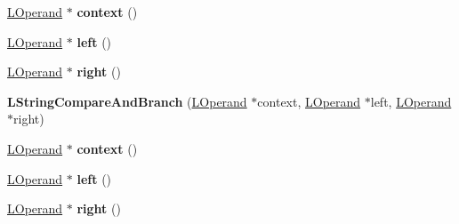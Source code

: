 \begin{DoxyCompactItemize}
\item 
\hyperlink{classv8_1_1internal_1_1_l_operand}{L\+Operand} $\ast$ {\bfseries context} ()\hypertarget{classv8_1_1internal_1_1_l_string_compare_and_branch_a15d4b6ad859b22bf4141edc055fe8050}{}\label{classv8_1_1internal_1_1_l_string_compare_and_branch_a15d4b6ad859b22bf4141edc055fe8050}

\item 
\hyperlink{classv8_1_1internal_1_1_l_operand}{L\+Operand} $\ast$ {\bfseries left} ()\hypertarget{classv8_1_1internal_1_1_l_string_compare_and_branch_a03846e908189b71209c862508f37b51a}{}\label{classv8_1_1internal_1_1_l_string_compare_and_branch_a03846e908189b71209c862508f37b51a}

\item 
\hyperlink{classv8_1_1internal_1_1_l_operand}{L\+Operand} $\ast$ {\bfseries right} ()\hypertarget{classv8_1_1internal_1_1_l_string_compare_and_branch_acb46bd2af08a91bc102ec2b5e919c6b5}{}\label{classv8_1_1internal_1_1_l_string_compare_and_branch_acb46bd2af08a91bc102ec2b5e919c6b5}

\item 
{\bfseries L\+String\+Compare\+And\+Branch} (\hyperlink{classv8_1_1internal_1_1_l_operand}{L\+Operand} $\ast$context, \hyperlink{classv8_1_1internal_1_1_l_operand}{L\+Operand} $\ast$left, \hyperlink{classv8_1_1internal_1_1_l_operand}{L\+Operand} $\ast$right)\hypertarget{classv8_1_1internal_1_1_l_string_compare_and_branch_abdd07c36cdda51e9673d4ee4dfc2734d}{}\label{classv8_1_1internal_1_1_l_string_compare_and_branch_abdd07c36cdda51e9673d4ee4dfc2734d}

\item 
\hyperlink{classv8_1_1internal_1_1_l_operand}{L\+Operand} $\ast$ {\bfseries context} ()\hypertarget{classv8_1_1internal_1_1_l_string_compare_and_branch_a15d4b6ad859b22bf4141edc055fe8050}{}\label{classv8_1_1internal_1_1_l_string_compare_and_branch_a15d4b6ad859b22bf4141edc055fe8050}

\item 
\hyperlink{classv8_1_1internal_1_1_l_operand}{L\+Operand} $\ast$ {\bfseries left} ()\hypertarget{classv8_1_1internal_1_1_l_string_compare_and_branch_a03846e908189b71209c862508f37b51a}{}\label{classv8_1_1internal_1_1_l_string_compare_and_branch_a03846e908189b71209c862508f37b51a}

\item 
\hyperlink{classv8_1_1internal_1_1_l_operand}{L\+Operand} $\ast$ {\bfseries right} ()\hypertarget{classv8_1_1internal_1_1_l_string_compare_and_branch_acb46bd2af08a91bc102ec2b5e919c6b5}{}\label{classv8_1_1internal_1_1_l_string_compare_and_branch_acb46bd2af08a91bc102ec2b5e919c6b5}


\end{DoxyCompactItemize}
